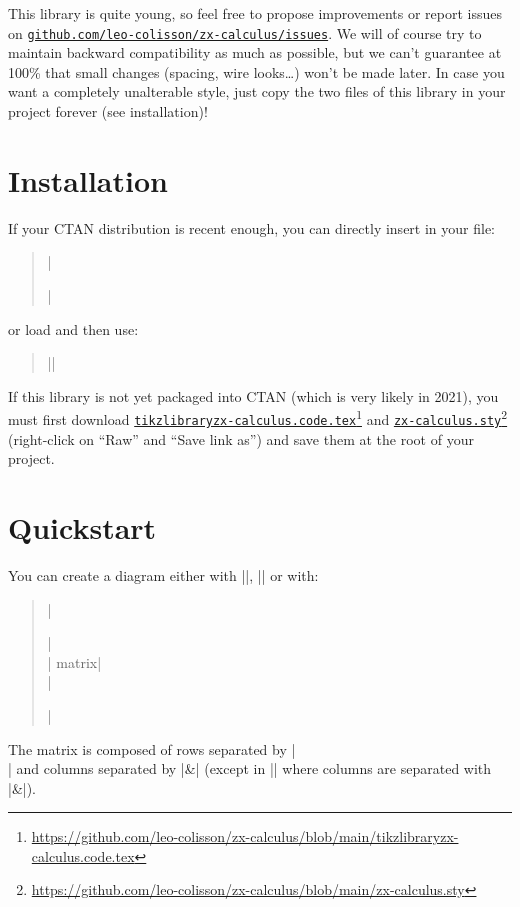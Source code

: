 \documentclass[a4paper,doc2]{ltxdoc} %
\newcommand{\mylink}[2]{\href{#1}{#2}\footnote{\url{#1}}}
\begin{document}
This library is quite young, so feel free to propose improvements or report issues on \href{https://github.com/leo-colisson/zx-calculus/issues}{\texttt{github.com/leo-colisson/zx-calculus/issues}}. We will of course try to maintain backward compatibility as much as possible, but we can't guarantee at 100\% that small changes (spacing, wire looks\dots{}) won't be made later. In case you want a completely unalterable style, just copy the two files of this library in your project forever (see installation)!

\section{Installation}

If your CTAN distribution is recent enough, you can directly insert in your file:
\begin{verse}
  |\usepackage{zx-calculus}|%
\end{verse}
or load \tikzname{} and then use:
\begin{verse}%
   |\usetikzlibrary{zx-calculus}|%
\end{verse}
If this library is not yet packaged into CTAN (which is very likely in 2021), you must first download \mylink{https://github.com/leo-colisson/zx-calculus/blob/main/tikzlibraryzx-calculus.code.tex}{\texttt{tikzlibraryzx-calculus.code.tex}} and \mylink{https://github.com/leo-colisson/zx-calculus/blob/main/zx-calculus.sty}{\texttt{zx-calculus.sty}} (right-click on ``Raw'' and ``Save link as'') and save them at the root of your project.

\section{Quickstart}

You can create a diagram either with ||, || or with:
\begin{verse}
  |\begin{ZX}[options]|\\
    |  matrix|\\
  |\end{ZX}|
\end{verse}
The matrix is composed of rows separated by |\\| and columns separated by |&| (except in |\zxAmp| where columns are separated with |\&|).
\end{document}
